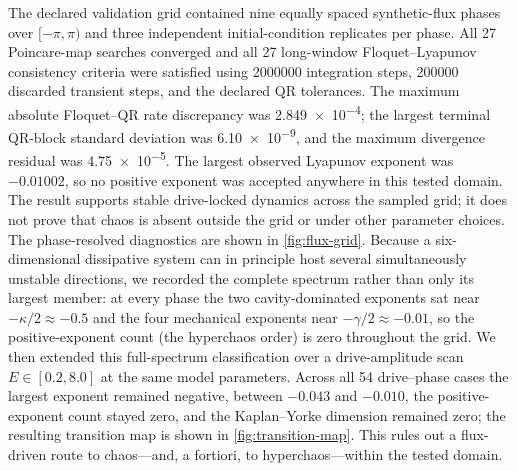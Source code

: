 \documentclass[aip,cha,reprint]{revtex4-2}
\begin{document}
The declared validation grid contained nine equally spaced synthetic-flux
phases over $[-\pi,\pi)$ and three independent initial-condition replicates per
phase. All 27 Poincare-map searches converged and all 27 long-window
Floquet--Lyapunov consistency criteria were satisfied using \num{2000000} integration steps,
\num{200000} discarded transient steps, and the declared QR tolerances. The maximum
absolute Floquet--QR rate discrepancy was \num{2.849e-4}; the largest terminal
QR-block standard deviation was \num{6.10e-9}, and the maximum divergence residual
was \num{4.75e-5}. The largest observed Lyapunov exponent was
$-\num{0.01002}$, so no positive exponent was accepted anywhere in this tested
domain. The result supports stable drive-locked dynamics across the sampled grid;
it does not prove that chaos is absent outside the grid or under other parameter
choices. The phase-resolved diagnostics are shown in \cref{fig:flux-grid}.
Because a six-dimensional dissipative system can in principle host several
simultaneously unstable directions, we recorded the complete spectrum rather than
only its largest member: at every phase the two cavity-dominated exponents sat near
$-\kappa/2\approx\num{-0.5}$ and the four mechanical exponents near
$-\gamma/2\approx\num{-0.01}$, so the positive-exponent count (the hyperchaos order)
is zero throughout the grid. We then extended this full-spectrum classification over a
drive-amplitude scan $E\in[\num{0.2},\num{8.0}]$ at the same model parameters.
Across all 54 drive--phase cases the largest exponent remained negative, between
$\num{-0.043}$ and $\num{-0.010}$, the positive-exponent count stayed zero, and the
Kaplan--Yorke dimension remained zero; the resulting transition map is shown in
\cref{fig:transition-map}. This rules out a flux-driven route to chaos---and, a
fortiori, to hyperchaos---within the tested domain.
\end{document}
